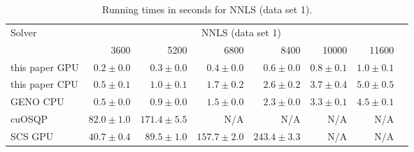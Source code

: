
\begin{table}[h!]
\begin{center}
  \small
  \begin{tabular}{l*{7}{r}}
    \toprule
    \multirow{2}{*}{Solver} & \multicolumn{6}{c}{NNLS (data set 1)} \\
    \cmidrule{2-7}
                   & 3600 & 5200 & 6800 & 8400 & 10000 & 11600 \\
    \midrule
    this paper GPU & $0.2\pm 0.0$ & $0.3\pm 0.0$ & $0.4\pm 0.0$ & $0.6\pm 0.0$ & $0.8\pm 0.1$ & $1.0\pm 0.1$ \\
    this paper CPU & $0.5\pm 0.1$ & $1.0\pm 0.1$ & $1.7\pm 0.2$ & $2.6\pm 0.2$ & $3.7\pm 0.4$ & $5.0\pm 0.5$ \\
    GENO CPU       & $0.5\pm 0.0$ & $0.9\pm 0.0$ & $1.5\pm 0.0$ & $2.3\pm 0.0$ & $3.3\pm 0.1$ & $4.5\pm 0.1$ \\
    cuOSQP         & $82.0\pm 1.0$ & $171.4\pm 5.5$ & N/A & N/A & N/A & N/A \\
    SCS GPU        & $40.7\pm 0.4$ & $89.5\pm 1.0$ & $157.7\pm 2.0$ & $243.4\pm 3.3$ & N/A & N/A \\
    \bottomrule
  \end{tabular}%
  \caption{Running times in seconds for NNLS (data set 1).}
  \end{center}
\end{table}
